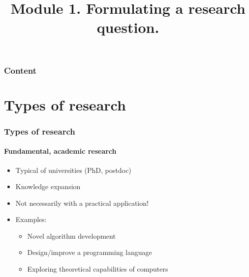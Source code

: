 \documentclass[aspectratio=169]{beamer}
\title{Module 1. Formulating a research question.}
\subtitle{\coursename}
\author{\lecturers}   %
\date{\academicyear}
\begin{document}
    
    \begin{frame}
        \maketitle
    \end{frame}
    
    \begin{frame}
        \frametitle{Content}
        
        \tableofcontents
    \end{frame}
    
    \section{Types of research}
    
    \begin{frame}
        \frametitle{Types of research}
        \framesubtitle{Fundamental, academic research}
        
        \begin{itemize}
            \item Typical of universities (PhD, postdoc)
            \item Knowledge expansion
            \item Not necessarily with a practical application!
            \item Examples:
            \begin{itemize}
                \item Novel algorithm development
                \item Design/improve a programming language
                \item Exploring theoretical capabilities of computers
            \end{itemize}
        \end{itemize}
        
    \end{frame}
    
\end{document}
